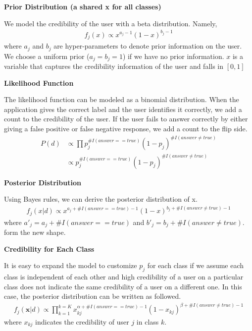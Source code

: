 \documentclass[a4paper,10pt]{article}
\begin{document}
\hspace{0 mm}

\noindent \textbf{Prior Distribution (a shared x for all classes)}

\noindent We model the credibility of the user with a beta distribution. Namely, 
\begin{align}
f_j(x) \propto x^{a_j - 1}(1-x)^{b_j - 1}
\end{align}
where $a_j$ and $b_j$ are hyper-parameters to denote prior information on the user. We choose a uniform prior ($a_j = b_j = 1$) if we have no prior information. $x$ is a variable that captures the credibility information of the user and falls in $[0,1]$

\hspace{0 mm}

\noindent \textbf{Likelihood Function}

\noindent The likelihood function can be modeled as a binomial distribution. When the application gives the correct label and the user identifies it correctly, we add a count to the credibility of the user. If the user fails to answer correctly by either giving a false positive or false negative response, we add a count to the flip side. 
\begin{align}
P(d) &\propto \prod p_j^{\#I(answer == true)}(1-p_j)^{\#I(answer \neq true)}\\
&\propto p_j^{\#I(answer == true)}(1-p_j)^{\#I(answer \neq true)}
\end{align}

\hspace{0 mm}

\noindent \textbf{Posterior Distribution}

\noindent Using Bayes rules, we can derive the posterior distribution of x.
\begin{align}
f_j(x | d) \propto x^{a_j + \#I(answer == true) - 1}(1-x)^{b_j + \#I(answer \neq true) - 1}
\end{align}
where $a\prime_j = a_j + \#I(answer == true)$ and $b\prime_j = b_j + \#I(answer \neq true)$. form the new shape.

\hspace{0 mm}

\noindent \textbf{Credibility for Each Class}

\noindent It is easy to expand the model to customize $p_j$ for each class if we assume each class is independent of each other and high credibility of a user on a particular class does not indicate the same credibility of a user on a different one. In this case, the posterior distribution can be written as followed.
\begin{align}
f_j(\textbf{x} | d) \propto \prod \limits_{k=1}^{k=K} x_{kj}^{\alpha + \#I(answer == true) - 1}(1-x_{kj})^{\beta + \#I(answer \neq true) - 1}
\end{align}
where $x_{kj}$ indicates the credibility of user $j$ in class $k$.
\end{document}
